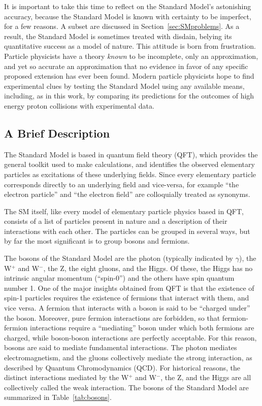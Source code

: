 It is important to take this time to reflect on the Standard Model's astonishing accuracy, because the Standard Model is known with certainty to be imperfect, for a few reasons. 
A subset are discussed in Section~\ref{sec:SMproblems}.
As a result, the Standard Model is sometimes treated with disdain, belying its quantitative success as a model of nature.
This attitude is born from frustration.
Particle physicists have a theory {\it known} to be incomplete, only an approximation, and yet so accurate an approximation that no evidence in favor of any specific proposed extension has ever been found.
Modern particle physicists hope to find experimental clues by testing the Standard Model using any available means, including, as in this work, by comparing its predictions for the outcomes of high energy proton collisions with experimental data.

  \subsection{A Brief Description} \label{sec:SMdescription}

  The Standard Model is based in quantum field theory (QFT), which provides the general toolkit used to make calculations, and identifies the observed elementary particles as excitations of these underlying fields.
  Since every elementary particle corresponds directly to an underlying field and vice-versa, for example ``the electron particle'' and ``the electron field'' are colloquially treated as synonyms.

  The SM itself, like every model of elementary particle physics based in QFT, consists of a list of particles present in nature and a description of their interactions with each other.
  The particles can be grouped in several ways, but by far the most significant is to group bosons and fermions.

  The bosons of the Standard Model are the photon (typically indicated by $\gamma$), the W$^+$ and W$^-$, the Z, the eight gluons, and the Higgs.
  Of these, the Higgs has no intrinsic angular momentum (``spin-0'') and the others have spin quantum number 1.
  One of the major insights obtained from QFT is that the existence of spin-1 particles requires the existence of fermions that interact with them, and vice versa.
  A fermion that interacts with a boson is said to be ``charged under'' the boson.
  Moreover, pure fermion interactions are forbidden, so that fermion-fermion interactions require a ``mediating'' boson under which both fermions are charged, while boson-boson interactions are perfectly acceptable.
  For this reason, bosons are said to mediate fundamental interactions.
  The photon mediates electromagnetism, and the gluons collectively mediate the strong interaction, as described by Quantum Chromodynamics (QCD).
  For historical reasons, the distinct interactions mediated by the W$^+$ and W$^-$, the Z, and the Higgs are all collectively called the weak interaction.
  The bosons of the Standard Model are summarized in Table~\ref{tab:bosons}.

